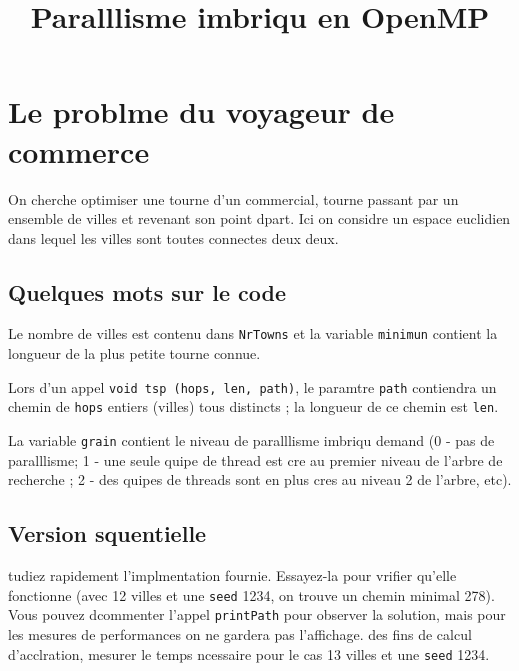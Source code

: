 \documentclass[A4wide]{article}
\title{Paralllisme imbriqu en OpenMP}
\date{}
\begin{document}
\maketitle








\section{Le problme du voyageur de commerce}

On cherche  optimiser une tourne d'un commercial, tourne passant
par un ensemble de villes et revenant  son point dpart. Ici on
considre un espace euclidien dans lequel les villes sont toutes
connectes deux  deux.


\subsection{Quelques mots sur le code}

Le nombre de villes est contenu dans \verb#NrTowns# et la variable
\verb#minimun# contient la longueur de la plus petite tourne connue.

Lors d'un appel \verb#void tsp (hops, len, path)#, le paramtre
\verb#path# contiendra un chemin de \verb#hops# entiers (villes) tous
distincts ; la longueur de ce chemin est \verb#len#. 

La variable \verb#grain# contient le niveau de paralllisme imbriqu
demand (0 - pas de paralllisme; 1 - une seule quipe de thread est
cre au premier niveau de l'arbre de recherche ; 2 - des quipes de
threads sont en plus cres au niveau 2 de l'arbre, etc).

\subsection{Version squentielle}
tudiez rapidement l'implmentation fournie. Essayez-la pour vrifier
qu'elle fonctionne (avec 12 villes et une \verb#seed# 1234, on trouve
un chemin minimal 278). Vous pouvez dcommenter l'appel 
\verb#printPath# pour observer la solution, mais pour les mesures de
performances on ne gardera pas l'affichage.  des fins de calcul
d'acclration, mesurer le temps ncessaire pour le cas 13 villes et
une \verb#seed# 1234.
\end{document}
